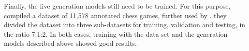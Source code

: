 Finally, the five generation models still need to be trained. For this purpose, \cite{jhamtani-etal-2018-learning} compiled a dataset of 11,578 annotated chess games, further used by \citep{zang-etal-2019-automated}. they divided the dataset into three sub-datasets for training, validation and testing, in the ratio 7:1:2. In both cases, training with the data set and the generation models described above showed good results.





